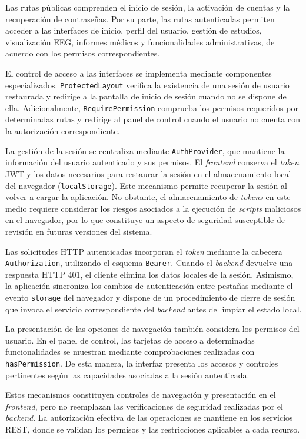 Las rutas públicas comprenden el inicio de sesión,
la activación de cuentas y la recuperación de
contraseñas. Por su parte, las rutas autenticadas
permiten acceder a las interfaces de inicio,
perfil del usuario, gestión de estudios,
visualización EEG, informes médicos y
funcionalidades administrativas, de acuerdo
con los permisos correspondientes.

El control de acceso a las interfaces se
implementa mediante componentes especializados.
\texttt{ProtectedLayout} verifica la existencia
de una sesión de usuario restaurada y redirige
a la pantalla de inicio de sesión cuando no
se dispone de ella. Adicionalmente,
\texttt{RequirePermission} comprueba los
permisos requeridos por determinadas rutas
y redirige al panel de control cuando el
usuario no cuenta con la autorización
correspondiente.


La gestión de la sesión se centraliza mediante
\texttt{AuthProvider}, que mantiene la información
del usuario autenticado y sus permisos. El \textit{frontend}
conserva el \textit{token} JWT y los datos necesarios para
restaurar la sesión en el almacenamiento local del
navegador (\texttt{localStorage}). Este mecanismo
permite recuperar la sesión al volver a cargar la
aplicación. No obstante, el almacenamiento de \textit{tokens}
en este medio requiere considerar los riesgos asociados
a la ejecución de \textit{scripts} maliciosos en el navegador,
por lo que constituye un aspecto de seguridad
susceptible de revisión en futuras versiones del sistema.


Las solicitudes HTTP autenticadas incorporan
el \textit{token} mediante la cabecera
\texttt{Authorization}, utilizando el esquema
\texttt{Bearer}. Cuando el \textit{backend} devuelve
una respuesta HTTP 401, el cliente elimina
los datos locales de la sesión. Asimismo,
la aplicación sincroniza los cambios de
autenticación entre pestañas mediante el
evento \texttt{storage} del navegador y
dispone de un procedimiento de cierre de
sesión que invoca el servicio correspondiente
del \textit{backend} antes de limpiar el estado local.

La presentación de las opciones de navegación
también considera los permisos del usuario.
En el panel de control, las tarjetas de acceso
a determinadas funcionalidades se muestran
mediante comprobaciones realizadas con
\texttt{hasPermission}. De esta manera,
la interfaz presenta los accesos y controles
pertinentes según las capacidades asociadas
a la sesión autenticada.

Estos mecanismos constituyen controles de
navegación y presentación en el \textit{frontend},
pero no reemplazan las verificaciones de
seguridad realizadas por el \textit{backend}.
La autorización efectiva de las operaciones
se mantiene en los servicios REST, donde
se validan los permisos y las restricciones
aplicables a cada recurso.

